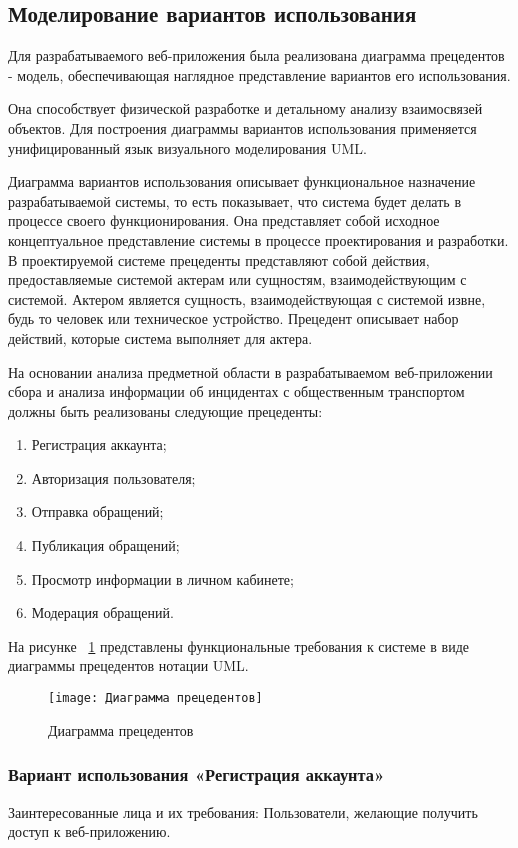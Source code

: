\subsection{Моделирование вариантов использования}

Для разрабатываемого веб-приложения была реализована диаграмма прецедентов - модель, обеспечивающая наглядное представление вариантов его использования. 

Она способствует физической разработке и детальному анализу взаимосвязей объектов. Для построения диаграммы вариантов использования применяется унифицированный язык визуального моделирования UML. 

Диаграмма вариантов использования описывает функциональное назначение разрабатываемой системы, то есть показывает, что система будет делать в процессе своего функционирования. Она представляет собой исходное концептуальное представление системы в процессе проектирования и разработки. В проектируемой системе прецеденты представляют собой действия, предоставляемые системой актерам или сущностям, взаимодействующим с системой. Актером является сущность, взаимодействующая с системой извне, будь то человек или техническое устройство. Прецедент описывает набор действий, которые система выполняет для актера.

На основании анализа предметной области в разрабатываемом веб-приложении сбора и анализа информации об инцидентах с общественным транспортом должны быть реализованы следующие прецеденты:
\begin{enumerate}
\item Регистрация аккаунта;
\item Авторизация пользователя;
\item Отправка обращений;
\item Публикация обращений;
\item Просмотр информации в личном кабинете;
\item Модерация обращений.
\end{enumerate}

На рисунке ~\ref{templ:image} представлены функциональные требования к системе в виде диаграммы прецедентов нотации UML.
\begin{figure}[H]
	\texttt{[image: Диаграмма прецедентов]}
	\caption{Диаграмма прецедентов}
	\label{templ:image}
\end{figure}

\subsubsection {Вариант использования «Регистрация аккаунта»}
Заинтересованные лица и их требования: Пользователи, желающие получить доступ к веб-приложению.

